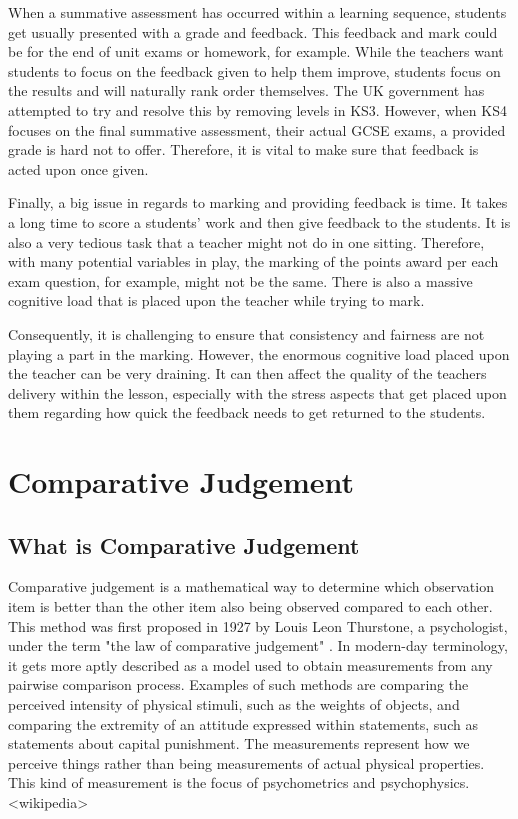 		When a summative assessment has occurred within a learning sequence, students get usually presented with a grade and feedback. This feedback and mark could be for the end of unit exams or homework, for example. While the teachers want students to focus on the feedback given to help them improve, students focus on the results and will naturally rank order themselves. The UK government has attempted to try and resolve this by removing levels in KS3. However, when KS4 focuses on the final summative assessment, their actual GCSE exams, a provided grade is hard not to offer. Therefore, it is vital to make sure that feedback is acted upon once given.
		
		Finally, a big issue in regards to marking and providing feedback is time. It takes a long time to score a students' work and then give feedback to the students. It is also a very tedious task that a teacher might not do in one sitting. Therefore, with many potential variables in play, the marking of the points award per each exam question, for example, might not be the same. There is also a massive cognitive load that is placed upon the teacher while trying to mark.
		
		Consequently, it is challenging to ensure that consistency and fairness are not playing a part in the marking. However, the enormous cognitive load placed upon the teacher can be very draining. It can then affect the quality of the teachers delivery within the lesson, especially with the stress aspects that get placed upon them regarding how quick the feedback needs to get returned to the students.
	
	\section{Comparative Judgement}
	
	
	\subsection{What is Comparative Judgement} 
		Comparative judgement is a mathematical way to determine which observation item is better than the other item also being observed compared to each other. This method was first proposed in 1927 by Louis Leon Thurstone, a psychologist, under the term "the law of comparative judgement" \cite{thurstone1927psychophysical, thurstone1927law}. In modern-day terminology, it gets more aptly described as a model used to obtain measurements from any pairwise comparison process. Examples of such methods are comparing the perceived intensity of physical stimuli, such as the weights of objects, and comparing the extremity of an attitude expressed within statements, such as statements about capital punishment. The measurements represent how we perceive things rather than being measurements of actual physical properties. This kind of measurement is the focus of psychometrics and psychophysics. <wikipedia>
		
